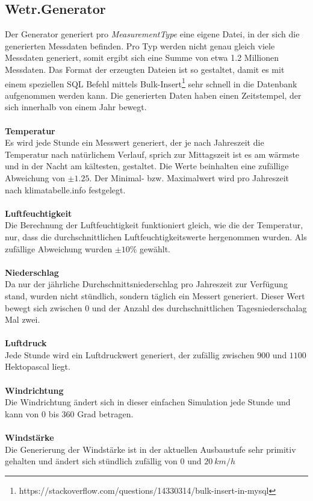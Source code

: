 \subsection{Wetr.Generator}
\label{sec:generator}

Der Generator generiert pro \textit{MeasurementType} eine eigene Datei, in der sich die generierten Messdaten befinden. Pro Typ werden nicht genau gleich viele Messdaten generiert, somit ergibt sich eine Summe von etwa 1.2 Millionen Messdaten. Das Format der erzeugten Dateien ist so gestaltet, damit es mit einem speziellen SQL Befehl mittels Bulk-Insert\footnote{https://stackoverflow.com/questions/14330314/bulk-insert-in-mysql} sehr schnell in die Datenbank aufgenommen werden kann. Die generierten Daten haben einen Zeitstempel, der sich innerhalb von einem Jahr bewegt.~\\~\\ %

\textbf{Temperatur}\\
Es wird jede Stunde ein Messwert generiert, der je nach Jahreszeit die Temperatur nach natürlichem Verlauf, sprich zur Mittagszeit ist es am wärmste und in der Nacht am kältesten, gestaltet. Die Werte beinhalten eine zufällige Abweichung von $\pm 1.25$. Der Minimal- bzw. Maximalwert wird pro Jahreszeit nach klimatabelle.info festgelegt.~\\~\\ %

\textbf{Luftfeuchtigkeit}\\
Die Berechnung der Luftfeuchtigkeit funktioniert gleich, wie die der Temperatur, nur, dass die durchschnittlichen Luftfeuchtigkeitswerte hergenommen wurden. Als zufällige Abweichung wurden $\pm10\%$ gewählt.~\\~\\ %

\textbf{Niederschlag}\\
Da nur der jährliche Durchschnittsniederschlag pro Jahreszeit zur Verfügung stand, wurden nicht stündlich, sondern täglich ein Messert generiert. Dieser Wert bewegt sich zwischen $0$ und der Anzahl des durchschnittlichen Tagesniederschalag Mal zwei.~\\~\\ %

\textbf{Luftdruck}\\
Jede Stunde wird ein Luftdruckwert generiert, der zufällig zwischen $900$ und $1100$ Hektopascal liegt.~\\~\\ %

\textbf{Windrichtung}\\
Die Windrichtung ändert sich in dieser einfachen Simulation jede Stunde und kann von $0$ bis $360$ Grad betragen.~\\~\\ %

\textbf{Windstärke}\\
Die Generierung der Windstärke ist in der aktuellen Ausbaustufe sehr primitiv gehalten und ändert sich stündlich zufällig von $0$ und $20\ km/h$
